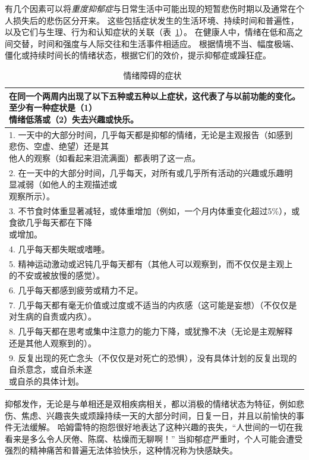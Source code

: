 有几个因素可以将\textit{重度抑郁症}与日常生活中可能出现的短暂悲伤时期以及通常在个人损失后的悲伤区分开来。
这些包括症状发生的生活环境、持续时间和普遍性，以及它们与生理、行为和认知症状的关联（表~\ref{tab:61_1}）。
在健康人中，情绪在低和高之间交替，时间和强度与人际交往和生活事件相适应。
根据情境不当、幅度极端、僵化或持续时间长的情绪状态，根据它们的效价，提示抑郁症或躁狂症。


\begin{table}[htbp]
	\caption{情绪障碍的症状~\cite{vahia2013diagnostic} \label{tab:61_1}}
	\begin{tabular}{l}
		\toprule
		\makecell[l]{在同一个两周内出现了以下五种或五种以上症状，这代表了与以前功能的变化。
		至少有一种症状是（1） \\情绪低落或（2）失去兴趣或快乐。} \\
		\midrule
		\makecell[l]{1. 一天中的大部分时间，几乎每天都是抑郁的情绪，无论是主观报告（如感到悲伤、空虚、绝望）还是其\\他人的观察（如看起来泪流满面）都表明了这一点。}\\
		\makecell[l]{2. 在一天中的大部分时间，几乎每天，对所有或几乎所有活动的兴趣或乐趣明显减弱（如他人的主观描述或\\观察所示）。}\\
		\makecell[l]{3. 不节食时体重显著减轻，或体重增加（例如，一个月内体重变化超过5\%），或食欲几乎每天都在下降\\或增加。}\\
		4. 几乎每天都失眠或嗜睡。\\
		5. 精神运动激动或迟钝几乎每天都有（其他人可以观察到，而不仅仅是主观上的不安或被放慢的感觉）。  \\
		6. 几乎每天都感到疲劳或精力不足。\\
		7. 几乎每天都有毫无价值或过度或不适当的内疚感（这可能是妄想）（不仅仅是对生病的自责或内疚）。\\
		8. 几乎每天都在思考或集中注意力的能力下降，或犹豫不决（无论是主观解释还是其他人观察到的）。\\
		\makecell[l]{9. 反复出现的死亡念头（不仅仅是对死亡的恐惧），没有具体计划的反复出现的自杀意念，或自杀未遂\\或自杀的具体计划。} \\
		\bottomrule
	\end{tabular}
\end{table}


抑郁发作，无论是与单相还是双相疾病相关，都以消极的情绪状态为特征，例如悲伤、焦虑、兴趣丧失或烦躁持续一天的大部分时间，日复一日，并且以前愉快的事件无法缓解。
哈姆雷特的抱怨很好地表达了这种兴趣的丧失，“人世间的一切在我看来是多么令人厌倦、陈腐、枯燥而无聊啊！” 
当抑郁症严重时，个人可能会遭受强烈的精神痛苦和普遍无法体验快乐，这种情况称为快感缺失。


